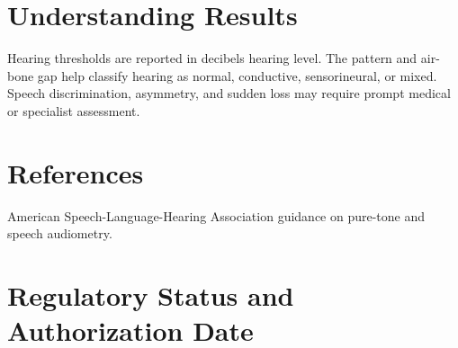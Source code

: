 \section*{Understanding Results}
Hearing thresholds are reported in decibels hearing level. The pattern and air-bone gap help classify hearing as normal, conductive, sensorineural, or mixed. Speech discrimination, asymmetry, and sudden loss may require prompt medical or specialist assessment.

\section*{References}
American Speech-Language-Hearing Association guidance on pure-tone and speech audiometry.

\clearpage


\section*{Regulatory Status and Authorization Date}

\clearpage
